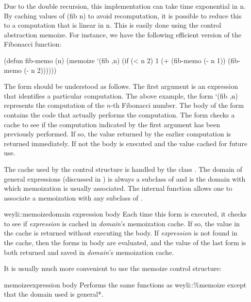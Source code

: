 Due to the double recursion, this implementation can take time
exponential in {\sf n}. By caching values of {\sf (fib n)} to avoid
recomputation, it is possible to reduce this to a computation that is
linear in {\sf n}. This is easily done using the control abstraction
{\sf memoize}. For instance, we have the following efficient version
of the Fibonacci function:
 
\begin{code}
(defun fib-memo (n)
  (memoize `(fib ,n) 
    (if (< n 2) 1 
        (+ (fib-memo (- n 1)) (fib-memo (- n 2))))))
\end{code}

The  form should be understood as follows.  The first
argument is an expression that identifies a particular computation.
The above example, the form {\sf `(fib ,n)} represents the computation
of the $n$-th Fibonacci number.  The body of the 
form contains the code that actually performs the computation.  The
 form checks a cache to see if the computation
indicated by the first argument has been previously performed.  If so,
the value returned by the earlier computation is returned immediately.
If not the body is executed and the value cached for future use.
  
The cache used by the  control structure is handled
by the class . The domain of general
expressions (discussed in ) is always a subclass
of  and is the domain with which
memoization is usually associated.  The internal function
 allows one to associate a memoization with
any subclass of .

\begin{methoddef}{weyli::{\percent}memoize}{domain expression \body body}
Each time this form is executed, it checks to see if {\em expression}
is cached in {\em domain}'s memoization cache.  If so, the value in
the cache is returned without executing the body. If {\em expression}
is not found in the cache, then the forms in body are evaluated, and
the value of the last form is both returned and saved in {\em
domain}'s memoization cache.
\end{methoddef}
  
It is usually much more convenient to use the {\sf memoize} control
structure:
  
\begin{specialdef}{memoize}{expression \body body}
Performs the same functions as {\sf weyli::\%memoize} except
that the domain used is {\sf *general*}. 
\end{specialdef}
  
